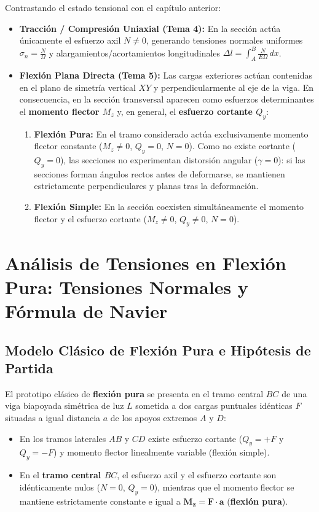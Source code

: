 Contrastando el estado tensional con el capítulo anterior:
\begin{itemize}
    \item \textbf{Tracción / Compresión Uniaxial (Tema 4):} En la sección actúa únicamente el esfuerzo axil $N \neq 0$, generando tensiones normales uniformes $\sigma_n = \frac{N}{\Omega}$ y alargamientos/acortamientos longitudinales $\Delta l = \int_A^B \frac{N}{E\Omega}\,dx$.
    \item \textbf{Flexión Plana Directa (Tema 5):} Las cargas exteriores actúan contenidas en el plano de simetría vertical $XY$ y perpendicularmente al eje de la viga. En consecuencia, en la sección transversal aparecen como esfuerzos determinantes el \textbf{momento flector $M_z$} y, en general, el \textbf{esfuerzo cortante $Q_y$}:
          \begin{enumerate}
              \item \textbf{Flexión Pura:} En el tramo considerado actúa exclusivamente momento flector constante ($M_z \neq 0$, $Q_y = 0$, $N = 0$). Como no existe cortante ($Q_y = 0$), las secciones no experimentan distorsión angular ($\gamma = 0$): si las secciones forman ángulos rectos antes de deformarse, se mantienen estrictamente perpendiculares y planas tras la deformación.
              \item \textbf{Flexión Simple:} En la sección coexisten simultáneamente el momento flector y el esfuerzo cortante ($M_z \neq 0$, $Q_y \neq 0$, $N = 0$).
          \end{enumerate}
\end{itemize}

\section{Análisis de Tensiones en Flexión Pura: Tensiones Normales y Fórmula de Navier}

\subsection{Modelo Clásico de Flexión Pura e Hipótesis de Partida}

El prototipo clásico de \textbf{flexión pura} se presenta en el tramo central $BC$ de una viga biapoyada simétrica de luz $L$ sometida a dos cargas puntuales idénticas $F$ situadas a igual distancia $a$ de los apoyos extremos $A$ y $D$:
\begin{itemize}
    \item En los tramos laterales $AB$ y $CD$ existe esfuerzo cortante ($Q_y = +F$ y $Q_y = -F$) y momento flector linealmente variable (flexión simple).
    \item En el \textbf{tramo central $BC$}, el esfuerzo axil y el esfuerzo cortante son idénticamente nulos ($N = 0$, $Q_y = 0$), mientras que el momento flector se mantiene estrictamente constante e igual a $\mathbf{M_z = F \cdot a}$ (\textbf{flexión pura}).
\end{itemize}

